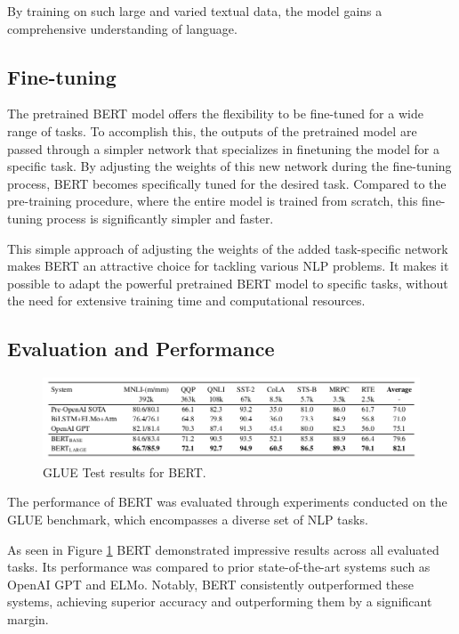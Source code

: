 \documentclass[a4paper,10pt]{report}
\begin{document}
By training on such large and varied textual data, the model gains a comprehensive understanding of language. \cite{bert}

\subsection{Fine-tuning}
The pretrained BERT model offers the flexibility to be fine-tuned for a wide range of tasks. To accomplish this, the outputs of the pretrained model are passed through a simpler network that specializes in finetuning the model for a specific task. By adjusting the weights of this new network during the fine-tuning process, BERT becomes specifically tuned for the desired task. Compared to the pre-training procedure, where the entire model is trained from scratch, this fine-tuning process is significantly simpler and faster.

This simple approach of adjusting the weights of the added task-specific network makes BERT an attractive choice for tackling various NLP problems. It makes it possible to adapt the powerful pretrained BERT model to specific tasks, without the need for extensive training time and computational resources. \cite{bert}


\subsection{Evaluation and Performance}
\begin{figure}
  \centering
  \includegraphics[width=12cm]{img/bert_results.png}
  \caption{GLUE Test results for BERT. \cite{bert}}
  \label{fig:bert_results}
\end{figure}

The performance of BERT was evaluated through experiments conducted on the GLUE benchmark, which encompasses a diverse set of NLP tasks.

As seen in Figure \ref{fig:bert_results} BERT demonstrated impressive results across all evaluated tasks. Its performance was compared to prior state-of-the-art systems such as OpenAI GPT and ELMo. Notably, BERT consistently outperformed these systems, achieving superior accuracy and outperforming them by a significant margin.
\end{document}
